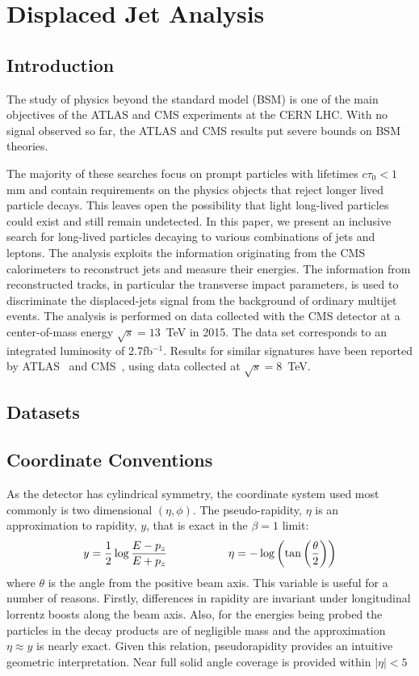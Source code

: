 \chapter{Displaced Jet Analysis \label{ch:analysis}}

\section{Introduction}

The study of physics beyond the standard model (BSM) is one of the main
objectives of the ATLAS and CMS experiments at the CERN LHC. With no
signal observed so far, the ATLAS and CMS results put severe bounds on
BSM theories.

The majority of these searches focus on prompt particles with
lifetimes $c\tau_0<1$mm and contain requirements on the
physics objects that reject longer lived particle
decays. This leaves open the possibility that light long-lived particles
could exist and still remain undetected.  In this paper, we present an
inclusive search for long-lived particles decaying to various
combinations of jets and leptons. The analysis exploits the
information originating from the CMS calorimeters to reconstruct jets
and measure their energies. The information from reconstructed tracks,
in particular the transverse impact parameters, is used to
discriminate the displaced-jets signal from the background of ordinary
multijet events.  The analysis is performed on data collected with the
CMS detector at a center-of-mass energy $\sqrt{s}=13$~TeV in 2015. The
data set corresponds to an integrated luminosity of
2.7fb$^{-1}$. Results for similar signatures have been reported by
ATLAS~\cite{PhysRevD.92.012010,Aad:2015rba} and
CMS~\cite{CMS:2014wda}, using data collected at $\sqrt{s}=8$~TeV.

\section{Datasets} 

\section{Coordinate Conventions}

 As the detector has cylindrical symmetry, the coordinate system used most commonly is two dimensional $(\eta, \phi)$. The pseudo-rapidity, $\eta$ is an approximation to rapidity, $y$, that is exact in the $\beta = 1$ limit:
\begin{align*}
y = \frac{1}{2}\log \frac{E - p_z}{E+p_z}\hspace{.75in} \eta = - \log \left( \tan\left (\frac{\theta}{2} \right ) \right)  
\end{align*}
where $\theta$ is the angle from the positive beam axis. This variable is useful for a number of reasons. Firstly, differences in rapidity are invariant under longitudinal lorrentz boosts along the beam axis. Also, for the energies being probed the particles in the decay products are of negligible mass and the approximation $\eta \approx y$ is nearly exact. Given this relation, pseudorapidity provides an intuitive geometric interpretation. Near full solid angle coverage is provided within $|\eta| < 5$

